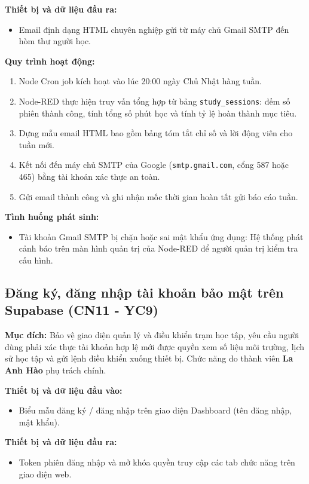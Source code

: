 \textbf{Thiết bị và dữ liệu đầu ra:}
\begin{itemize}
    \item Email định dạng HTML chuyên nghiệp gửi từ máy chủ Gmail SMTP đến hòm thư người học.
\end{itemize}

\textbf{Quy trình hoạt động:}
\begin{enumerate}
    \item Node Cron job kích hoạt vào lúc 20:00 ngày Chủ Nhật hàng tuần.
    \item Node-RED thực hiện truy vấn tổng hợp từ bảng \texttt{study\_sessions}: đếm số phiên thành công, tính tổng số phút học và tính tỷ lệ hoàn thành mục tiêu.
    \item Dựng mẫu email HTML bao gồm bảng tóm tắt chỉ số và lời động viên cho tuần mới.
    \item Kết nối đến máy chủ SMTP của Google (\texttt{smtp.gmail.com}, cổng 587 hoặc 465) bằng tài khoản xác thực an toàn.
    \item Gửi email thành công và ghi nhận mốc thời gian hoàn tất gửi báo cáo tuần.
\end{enumerate}

\textbf{Tình huống phát sinh:}
\begin{itemize}
    \item Tài khoản Gmail SMTP bị chặn hoặc sai mật khẩu ứng dụng: Hệ thống phát cảnh báo trên màn hình quản trị của Node-RED để người quản trị kiểm tra cấu hình.
\end{itemize}

\subsection{Đăng ký, đăng nhập tài khoản bảo mật trên Supabase (CN11 - YC9)}
\textbf{Mục đích:}
Bảo vệ giao diện quản lý và điều khiển trạm học tập, yêu cầu người dùng phải xác thực tài khoản hợp lệ mới được quyền xem số liệu môi trường, lịch sử học tập và gửi lệnh điều khiển xuống thiết bị. Chức năng do thành viên \textbf{La Anh Hào} phụ trách chính.

\textbf{Thiết bị và dữ liệu đầu vào:}
\begin{itemize}
    \item Biểu mẫu đăng ký / đăng nhập trên giao diện Dashboard (tên đăng nhập, mật khẩu).
\end{itemize}

\textbf{Thiết bị và dữ liệu đầu ra:}
\begin{itemize}
    \item Token phiên đăng nhập và mở khóa quyền truy cập các tab chức năng trên giao diện web.
\end{itemize}

